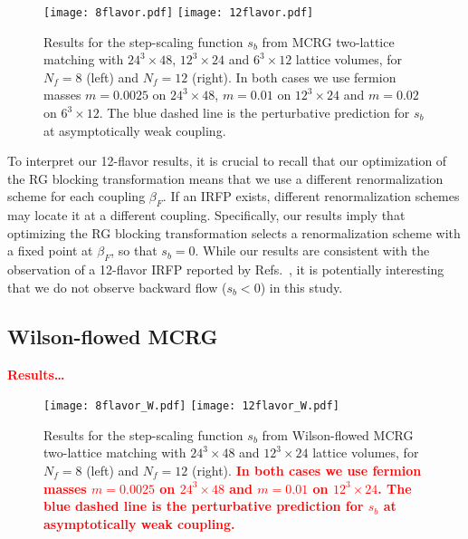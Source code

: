 \documentclass{PoS}
\newcommand{\be}{\ensuremath{\beta} }
\newcommand{\X}{\ensuremath{\!\times\!} }
\newcommand{\TODO}[1]{\textcolor{red}{{\bf #1}}}
\begin{document}
\begin{figure}[htpb]
  \texttt{[image: 8flavor.pdf]}\hfill
  \texttt{[image: 12flavor.pdf]}
  \caption{Results for the step-scaling function $s_b$ from MCRG two-lattice matching with $24^3\X48$, $12^3\X24$ and $6^3\X12$ lattice volumes, for $N_f = 8$ (left) and $N_f = 12$ (right).  In both cases we use fermion masses $m = 0.0025$ on $24^3\X48$, $m = 0.01$ on $12^3\X24$ and $m = 0.02$ on $6^3\X12$.  The blue dashed line is the perturbative prediction for $s_b$ at asymptotically weak coupling.}
  \label{fig:MCRG}
\end{figure}

To interpret our 12-flavor results, it is crucial to recall that our optimization of the RG blocking transformation means that we use a different renormalization scheme for each coupling $\be_F$.
If an IRFP exists, different renormalization schemes may locate it at a different coupling.
Specifically, our results imply that optimizing the RG blocking transformation selects a renormalization scheme with a fixed point at $\be_F$, so that $s_b = 0$.
While our results are consistent with the observation of a 12-flavor IRFP reported by Refs.~\cite{Hasenfratz:2011xn, Hasenfratz:2011np}, it is potentially interesting that we do not observe backward flow ($s_b < 0$) in this study.



\subsection{\label{sec:WMCRGresults}Wilson-flowed MCRG} %
\TODO{Results\dots}

\begin{figure}[htpb]
  \texttt{[image: 8flavor\_W.pdf]}\hfill
  \texttt{[image: 12flavor\_W.pdf]}
  \caption{Results for the step-scaling function $s_b$ from Wilson-flowed MCRG two-lattice matching with $24^3\X48$ and $12^3\X24$ lattice volumes, for $N_f = 8$ (left) and $N_f = 12$ (right).  \TODO{In both cases we use fermion masses $m = 0.0025$ on $24^3\X48$ and $m = 0.01$ on $12^3\X24$.  The blue dashed line is the perturbative prediction for $s_b$ at asymptotically weak coupling.}}
  \label{fig:WMCRG}
\end{figure}
\end{document}
